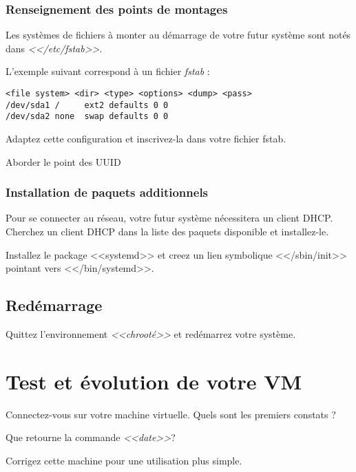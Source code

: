\documentclass[11pt]{article}
\begin{document}
\subsubsection{Renseignement des points de montages}

Les systèmes de fichiers à monter au démarrage de votre futur système sont
notés dans \emph{<</etc/fstab>>}.

L'exemple suivant correspond à un fichier \emph{fstab} :

\begin{verbatim}
<file system> <dir> <type> <options> <dump> <pass>
/dev/sda1 /		ext2 defaults 0 0
/dev/sda2 none	swap defaults 0 0
\end{verbatim}

Adaptez cette configuration et inscrivez-la dans votre fichier fstab.

\begin{solution}
Aborder le point des UUID
\end{solution}

\subsubsection{Installation de paquets additionnels}

Pour se connecter au réseau, votre futur système nécessitera un client DHCP.
Cherchez un client DHCP dans la liste des paquets disponible et installez-le.

Installez le package <<systemd>> et creez un lien symbolique <</sbin/init>> pointant vers <</bin/systemd>>.

\subsection{Redémarrage}

Quittez l'environnement \emph{<<chrooté>>} et redémarrez votre système.

\section{Test et évolution de votre VM}

Connectez-vous sur votre machine virtuelle. Quels sont les premiers constats ?

Que retourne la commande \emph{<<date>>}?

Corrigez cette machine pour une utilisation plus simple.
\end{document}
